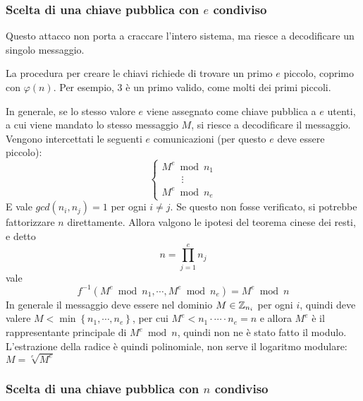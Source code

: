 \subsubsection{Scelta di una chiave pubblica con $e$ condiviso}

Questo attacco non porta a craccare l'intero sistema, ma riesce a decodificare un singolo messaggio.

La procedura per creare le chiavi richiede di trovare un primo $e$ piccolo, coprimo con $\varphi(n)$.
Per esempio, $3$ è un primo valido, come molti dei primi piccoli.

In generale, se lo stesso valore $e$ viene assegnato come chiave pubblica a $e$ utenti, a cui viene mandato lo stesso messaggio $M$, si riesce a decodificare il messaggio.
Vengono intercettati le seguenti $e$ comunicazioni (per questo $e$ deve essere piccolo):
\begin{equation*}
    \begin{cases}
        M^e \bmod n_1
        \\
        \quad
        \quad
        \vdots
        \\
        M^e \bmod n_e
    \end{cases}
\end{equation*}
E vale $
gcd(n_i, n_j) = 1
$ per ogni $i \ne j$.
Se questo non fosse verificato, si potrebbe fattorizzare $n$ direttamente.
Allora valgono le ipotesi del teorema cinese dei resti, e detto
\begin{equation*}
    n = \prod_{j=1}^{e} n_j
\end{equation*}
vale 
\begin{equation*}
    f^{-1} \left( 
    M^e \bmod n_1
    , \cdots ,
    M^e \bmod n_e
    \right)
    =
    M^e \bmod n 
\end{equation*}
In generale il messaggio deve essere nel dominio $
M \in \mathbb{Z}_{n_i} 
$ per ogni $i$, quindi deve valere $
M < \min \left\{ n_1, \cdots, n_e \right\}
$, per cui $
M^e < n_1 \cdot \cdots \cdot n_e = n
$ e allora $M^e$ è il rappresentante principale di $
M^e \bmod n 
$, quindi non ne è stato fatto il modulo.
L'estrazione della radice è quindi polinomiale, non serve il logaritmo modulare: $
M = \sqrt[e]{M^e}
$

\subsubsection{Scelta di una chiave pubblica con $n$ condiviso}

